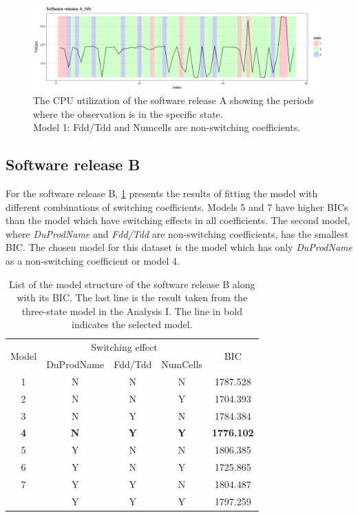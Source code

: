 \begin{figure}[H]
\centering{}\includegraphics[scale=0.35]{picture/L16A_NN1}\caption{The CPU utilization of the software release A showing the periods
where the observation is in the specific state. \protect \\
Model 1: Fdd/Tdd and Numcells are non-switching coefficients.}
\label{L16A_NN}
\end{figure}


\subsection{Software release B}

For the software release B, \ref{L16B_switch} presents the results
of fitting the model with different combinations of switching coefficients.
Models 5 and 7 have higher BICs than the model which have switching
effects in all coefficients. The second model, where \emph{DuProdName}
and \emph{Fdd/Tdd} are non-switching coefficients, has the smallest
BIC. The chosen model for this dataset is the model which has only
\emph{DuProdName} as a non-switching coefficient or model 4.

\begin{table}[h]
\caption{List of the model structure of the software release B along with its
BIC. The last line is the result taken from the three-state model
in the Analysis I. The line in bold indicates the selected model.}
\label{L16B_switch}
\centering{}%
\begin{tabular}{ccccc}
\toprule 
\multirow{2}{*}{Model} & \multicolumn{3}{c}{Switching effect} & \multirow{2}{*}{BIC}\tabularnewline
\cmidrule{2-4} 
 & DuProdName & Fdd/Tdd & NumCells & \tabularnewline
\midrule
\midrule 
1 & N & N & N & 1787.528\tabularnewline
2 & N & N & Y & 1704.393\tabularnewline
3 & N & Y & N & 1784.384\tabularnewline
\textbf{4} & \textbf{N} & \textbf{Y} & \textbf{Y} & \textbf{1776.102}\tabularnewline
5 & Y & N & N & 1806.385\tabularnewline
6 & Y & N & Y & 1725.865\tabularnewline
7 & Y & Y & N & 1804.487\tabularnewline
\midrule
 & Y & Y & Y & 1797.259\tabularnewline
\bottomrule
\end{tabular}
\end{table}

